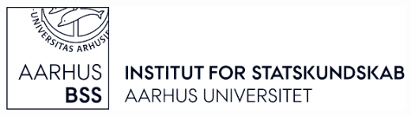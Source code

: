 





	\vfill\vfill
	\includegraphics[width=4\textwidth]{format/images/ifsk-logo-black.png}\\[1cm] %
